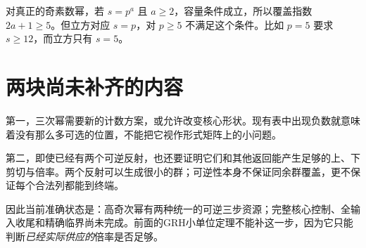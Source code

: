 对真正的奇素数幂，若 $s=p^a$ 且 $a\ge2$，容量条件成立，所以覆盖指数 $2a+1\ge5$。但立方对应 $s=p$，对 $p\ge5$ 不满足这个条件。比如 $p=5$ 要求 $s\ge12$，而立方只有 $s=5$。

\section{两块尚未补齐的内容}
第一，三次幂需要新的计数方案，或允许改变核心形状。现有表中出现负数就意味着没有那么多可选的位置，不能把它视作形式矩阵上的小问题。

第二，即使已经有两个可逆反射，也还要证明它们和其他返回能产生足够的上、下剪切与倍率。两个反射可以生成很小的群；可逆性本身不保证同余群覆盖，更不保证每个合法列都能到终端。

因此当前准确状态是：高奇次幂有两种统一的可逆三步资源；完整核心控制、全输入收尾和精确临界尚未完成。前面的GRH小单位定理不能补这一步，因为它只能判断\emph{已经实际供应的}倍率是否足够。
